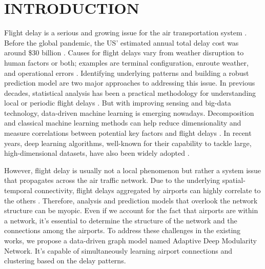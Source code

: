 \chapter{INTRODUCTION}
\pagestyle{fancy}

Flight delay is a serious and growing issue for the air transportation system \citep{kafle2016modeling}. Before the global pandemic, the US' estimated annual total delay cost was around \$30 billion \citep{ball2010total}. Causes for flight delays vary from weather disruption to human factors or both; examples are terminal configuration, enroute weather, and operational errors \citep{hsiao2006econometric}. Identifying underlying patterns and building a robust prediction model are two major approaches to addressing this issue. In previous decades, statistical analysis has been a practical methodology for understanding local or periodic flight delays \citep{doi:10.2514/6.2002-5866,mazzeo2003competition,ABDELATY2007355}. But with improving sensing and big-data technology, data-driven machine learning is emerging nowadays. Decomposition and classical machine learning methods can help reduce dimensionality and measure correlations between potential key factors and flight delays \citep{8911489,gorripaty2017identifying,grabbe2014clustering}. In recent years, deep learning algorithms, well-known for their capability to tackle large, high-dimensional datasets, have also been widely adopted \citep{8903554,9391561}. 

However, flight delay is usually not a local phenomenon but rather a system issue that propagates across the air traffic network. Due to the underlying spatial-temporal connectivity, flight delays aggregated by airports can highly correlate to the others \citep{li2019spectral}. Therefore, analysis and prediction models that overlook the network structure can be myopic. Even if we account for the fact that airports are within a network, it's essential to determine the structure of the network and the connections among the airports. To address these challenges in the existing works, we propose a data-driven graph model named Adaptive Deep Modularity Network. It's capable of simultaneously learning airport connections and clustering based on the delay patterns.


